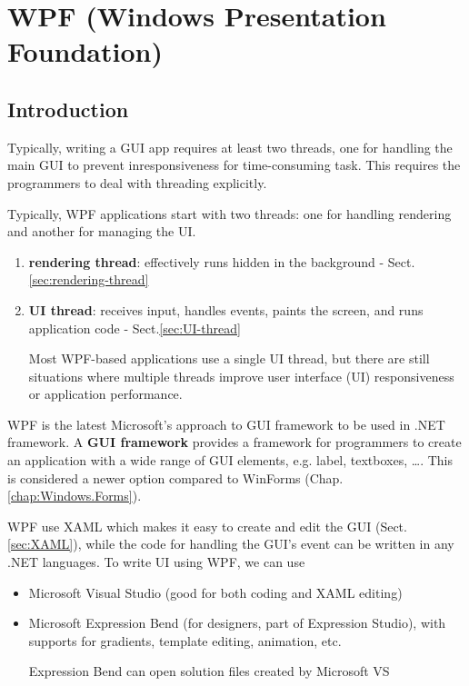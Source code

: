 \chapter{WPF (Windows Presentation Foundation)}
\label{chap:WPF}

\section{Introduction}

Typically, writing a GUI app requires at least two threads, one for handling the
main GUI to prevent inresponsiveness for time-consuming task. This requires the
programmers to deal with threading explicitly.

Typically, WPF applications start with two threads: one for handling rendering
and another for managing the UI.
\begin{enumerate}
  \item {\bf rendering thread}: effectively runs hidden in the background -
  Sect.\ref{sec:rendering-thread}
  
  \item {\bf UI thread}: receives input, handles events, paints the screen, and
  runs application code - Sect.\ref{sec:UI-thread} 

Most WPF-based applications use a single UI thread, but there are still
situations where multiple threads improve user interface (UI) responsiveness or
application performance.


\end{enumerate} 

WPF is the latest Microsoft's approach to GUI framework to be used in .NET
framework. A {\bf GUI framework} provides a framework for programmers to create
an application with a wide range of GUI elements, e.g. label, textboxes, \ldots.
This is considered a newer option compared to WinForms
(Chap.\ref{chap:Windows.Forms}).

WPF use XAML which makes it easy to create and edit the GUI
(Sect.\ref{sec:XAML}), while the code for handling the GUI's event can be
written in any .NET languages. To write UI using WPF, we can use
\begin{itemize}
  \item Microsoft Visual Studio (good for both coding and XAML editing)
  \item Microsoft Expression Bend (for designers, part of Expression Studio),
  with supports for gradients, template editing, animation, etc.
  
  Expression Bend can open solution files created by Microsoft VS
\end{itemize}

